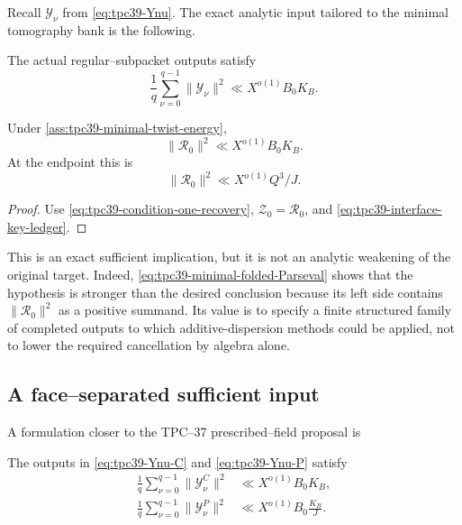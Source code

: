 Recall \(\mathscr Y_\nu\) from
\eqref{eq:tpc39-Ynu}.  The exact analytic input tailored to the minimal
tomography bank is the following.

\begin{assumption}
\label{ass:tpc39-minimal-twist-energy}
The actual regular--subpacket outputs satisfy
\begin{equation}
 \boxed{
 \frac1q\sum_{\nu=0}^{q-1}\|\mathscr Y_\nu\|^2
 \ll X^{o(1)}B_0K_B.}
 \label{eq:tpc39-minimal-twist-energy}
\end{equation}
\end{assumption}

\begin{theorem}
\label{thm:tpc39-conditional-equality-closure}
Under \cref{ass:tpc39-minimal-twist-energy},
\begin{equation}
 \|\mathscr R_0\|^2
 \ll X^{o(1)}B_0K_B.
 \label{eq:tpc39-conditional-equality-bound}
\end{equation}
At the endpoint this is
\begin{equation}
 \|\mathscr R_0\|^2
 \ll X^{o(1)}Q^3/J.
 \label{eq:tpc39-conditional-endpoint-gate}
\end{equation}
\end{theorem}

\begin{proof}
Use \eqref{eq:tpc39-condition-one-recovery},
\(\mathscr Z_0=\mathscr R_0\), and
\eqref{eq:tpc39-interface-key-ledger}.
\end{proof}

This is an exact sufficient implication, but it is not an analytic weakening
of the original target.  Indeed,
\eqref{eq:tpc39-minimal-folded-Parseval} shows that the hypothesis is
stronger than the desired conclusion because its left side contains
\(\|\mathscr R_0\|^2\) as a positive summand.  Its value is to specify a
finite structured family of completed outputs to which additive-dispersion
methods could be applied, not to lower the required cancellation by algebra
alone.

\subsection{A face--separated sufficient input}

A formulation closer to the TPC--37 prescribed--field proposal is
\begin{assumption}
\label{ass:tpc39-twist-stable-faces}
The outputs in \eqref{eq:tpc39-Ynu-C} and
\eqref{eq:tpc39-Ynu-P} satisfy
\begin{align}
 \frac1q\sum_{\nu=0}^{q-1}\|\mathscr Y_\nu^C\|^2
 &\ll X^{o(1)}B_0K_B,
 \label{eq:tpc39-twist-stable-C}\\
 \frac1q\sum_{\nu=0}^{q-1}\|\mathscr Y_\nu^P\|^2
 &\ll X^{o(1)}B_0\frac{K_B}{J}.
 \label{eq:tpc39-twist-stable-P}
\end{align}
\end{assumption}

